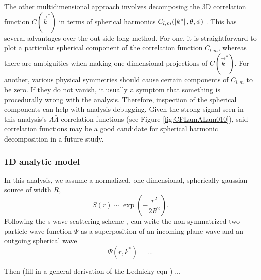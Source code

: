 The other multidimensional approach involves decomposing the 3D correlation function $C(\vec{k}^*)$ in terms of spherical harmonics $C_{l,m}(\left\lvert k^*\right\rvert,\theta, \phi)$ \cite{Chajecki:2008vg}.
This has several advantages over the out-side-long method.
For one, it is straightforward to plot a particular spherical component of the correlation function $C_{l,m}$, whereas there are ambiguities when making one-dimensional projections of $C(\vec{k}^*)$.
For another, various physical symmetries should cause certain components of $C_{l,m}$ to be zero.
If they do not vanish, it usually a symptom that something is procedurally wrong with the analysis.
Therefore, inspection of the spherical components can help with analysis debugging.
Given the strong signal seen in this analysis's $\Lambda\bar{\Lambda}$ correlation functions (see Figure \ref{fig:CFLamALam010}), said correlation functions may be a good candidate for spherical harmonic decomposition in a future study.


 
\subsubsection{1D analytic model}
\label{sec:AnalyticModel}

In this analysis, we assume a normalized, one-dimensional, spherically gaussian source of width $R$,
\begin{equation}
S(r) \sim \exp{(-\frac{r^2}{2R^2})}.
\end{equation}
Following the s-wave scattering scheme \cite{LANDAU1977502}, can write the non-symmatrized two-particle wave function $\Psi$ as a superposition of an incoming plane-wave and an outgoing spherical wave
\begin{equation}
\label{eq:swaveScattering}
\Psi(r,k^*) = ...
\end{equation}

Then (fill in a general derivation of the Lednicky eqn  \cite{lednicky82}) ...



